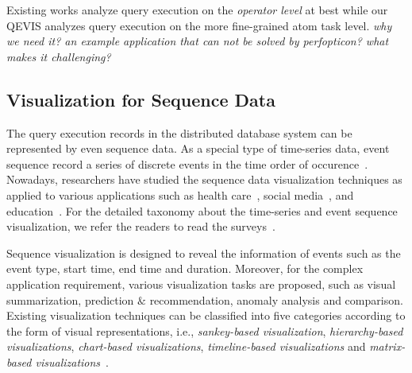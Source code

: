 

Existing works analyze query execution on the \textit{operator level} at best while our QEVIS analyzes query execution on the more fine-grained atom task level. \textit{why we need it? an example application that can not be solved by perfopticon? what makes it challenging?}   

\subsection{Visualization for Sequence Data}
The query execution records in the distributed database system can be represented by even sequence data.
As a special type of time-series data, event sequence record a series of discrete events in the time order of occurence~\cite{guo2020survey}. 
Nowadays, researchers have studied the sequence data visualization techniques as applied to various applications such as health care~\cite{malik2015cohort, wongsuphasawat2011outflow}, social media~\cite{zhao2014fluxflow, law2018maqui}, and education~\cite{chen2015peakvizor, mu2019moocad, goulden2019ccvis, he2019vuc, chen2018viseq}.
For the detailed taxonomy about the time-series and event sequence visualization, we refer the readers to read the surveys~\cite{guo2020survey, silva2000visualization}. 


Sequence visualization is designed to reveal the information of events such as the event type, start time, end time and duration. Moreover, for the complex application requirement, various visualization tasks are proposed, such as visual summarization, prediction $\&$ recommendation, anomaly analysis and comparison. Existing visualization techniques can be classified into five categories according to the form of visual representations, i.e., \emph{sankey-based visualization}, \emph{hierarchy-based visualizations}, \emph{chart-based visualizations}, \emph{timeline-based visualizations} and \emph{matrix-based visualizations}~\cite{guo2020survey}. 

